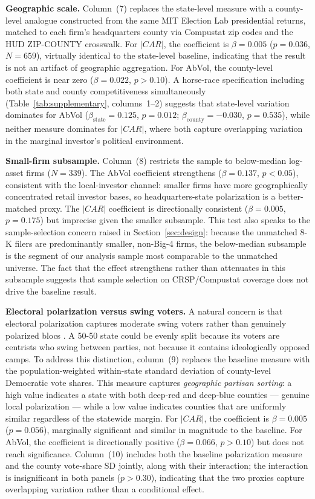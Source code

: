 \documentclass[12pt]{article}
\begin{document}
\textbf{Geographic scale.}
Column~(7) replaces the state-level measure with a county-level analogue
constructed from the same MIT Election Lab presidential returns, matched
to each firm's headquarters county via Compustat zip codes and the HUD
ZIP-COUNTY crosswalk. For $|CAR|$, the coefficient is $\beta = 0.005$
($p = 0.036$, $N = 659$), virtually identical to the state-level
baseline, indicating that the result is not an artifact of geographic
aggregation. For AbVol, the county-level coefficient is near zero
($\beta = 0.022$, $p > 0.10$). A horse-race specification including both state
and county competitiveness simultaneously (Table~\ref{tab:supplementary},
columns~1--2) suggests that state-level variation dominates for AbVol
($\beta_{\text{state}} = 0.125$, $p = 0.012$;
$\beta_{\text{county}} = -0.030$, $p = 0.535$), while neither measure
dominates for $|CAR|$, where both capture overlapping variation in the
marginal investor's political environment.

\textbf{Small-firm subsample.}
Column~(8) restricts the sample to below-median log-asset firms ($N = 339$).
The AbVol coefficient strengthens ($\beta = 0.137$, $p < 0.05$), consistent
with the local-investor channel: smaller firms have more geographically
concentrated retail investor bases, so headquarters-state polarization is
a better-matched proxy. The $|CAR|$ coefficient is directionally
consistent ($\beta = 0.005$, $p = 0.175$) but imprecise given the smaller
subsample. This test also speaks to the sample-selection concern raised in
Section~\ref{sec:design}: because the unmatched 8-K filers are
predominantly smaller, non-Big-4 firms, the below-median subsample is the
segment of our analysis sample most comparable to the unmatched universe.
The fact that the effect strengthens rather than attenuates in this
subsample suggests that sample selection on CRSP/Compustat coverage does
not drive the baseline result.

\textbf{Electoral polarization versus swing voters.}
A natural concern is that electoral polarization captures moderate swing
voters rather than genuinely polarized blocs \citep{fiorina2005}. A 50-50
state could be evenly split because its voters are centrists who swing
between parties, not because it contains ideologically opposed camps. To
address this distinction, column~(9) replaces the baseline measure with the
population-weighted within-state standard deviation of county-level
Democratic vote shares. This measure captures \emph{geographic partisan
sorting}: a high value indicates a state with both deep-red and deep-blue
counties --- genuine local polarization --- while a low value indicates
counties that are uniformly similar regardless of the statewide margin.
For $|CAR|$, the coefficient is $\beta = 0.005$ ($p = 0.056$), marginally
significant and similar in magnitude to the baseline. For AbVol, the
coefficient is directionally positive ($\beta = 0.066$, $p > 0.10$) but
does not reach significance.
Column~(10) includes both the baseline polarization measure and the
county vote-share SD jointly, along with their interaction; the interaction
is insignificant in both panels ($p > 0.30$), indicating that the two
proxies capture overlapping variation rather than a conditional effect.
\end{document}

